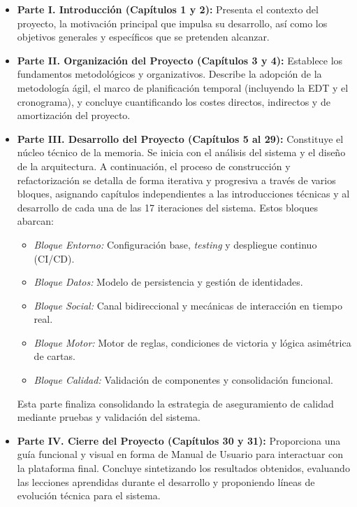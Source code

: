 \begin{itemize}
    \item \textbf{Parte I. Introducción (Capítulos 1 y 2):} Presenta el contexto del proyecto, la motivación principal que impulsa su desarrollo, así como los objetivos generales y específicos que se pretenden alcanzar.

    \item \textbf{Parte II. Organización del Proyecto (Capítulos 3 y 4):} Establece los fundamentos metodológicos y organizativos. Describe la adopción de la metodología ágil, el marco de planificación temporal (incluyendo la EDT y el cronograma), y concluye cuantificando los costes directos, indirectos y de amortización del proyecto.

    \item \textbf{Parte III. Desarrollo del Proyecto (Capítulos 5 al 29):} Constituye el núcleo técnico de la memoria. Se inicia con el análisis del sistema y el diseño de la arquitectura. A continuación, el proceso de construcción y refactorización se detalla de forma iterativa y progresiva a través de varios bloques, asignando capítulos independientes a las introducciones técnicas y al desarrollo de cada una de las 17 iteraciones del sistema. Estos bloques abarcan:
    \begin{itemize}
        \item \textit{Bloque Entorno:} Configuración base, \textit{testing} y despliegue continuo (CI/CD).
        \item \textit{Bloque Datos:} Modelo de persistencia y gestión de identidades.
        \item \textit{Bloque Social:} Canal bidireccional y mecánicas de interacción en tiempo real.
        \item \textit{Bloque Motor:} Motor de reglas, condiciones de victoria y lógica asimétrica de cartas.
        \item \textit{Bloque Calidad:} Validación de componentes y consolidación funcional.
    \end{itemize}
    Esta parte finaliza consolidando la estrategia de aseguramiento de calidad mediante pruebas y validación del sistema.

    \item \textbf{Parte IV. Cierre del Proyecto (Capítulos 30 y 31):} Proporciona una guía funcional y visual en forma de Manual de Usuario para interactuar con la plataforma final. Concluye sintetizando los resultados obtenidos, evaluando las lecciones aprendidas durante el desarrollo y proponiendo líneas de evolución técnica para el sistema.
\end{itemize}